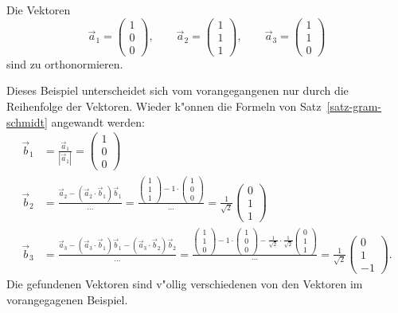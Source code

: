 \begin{beispiel}
Die Vektoren 
\[
\vec a_1=\begin{pmatrix}1\\0\\0\end{pmatrix},\qquad
\vec a_2=\begin{pmatrix}1\\1\\1\end{pmatrix},\qquad
\vec a_3=\begin{pmatrix}1\\1\\0\end{pmatrix} 
\]
sind zu orthonormieren.

Dieses Beispiel unterscheidet sich vom vorangegangenen nur
durch die Reihenfolge der Vektoren. Wieder k"onnen die 
Formeln von Satz~\ref{satz-gram-schmidt} angewandt werden:
\begin{align*}
\vec b_1&=\frac{\vec a_1}{|\vec a_1|}=\begin{pmatrix}1\\0\\0\end{pmatrix}
\\
\vec b_2
&=
\frac{\vec a_2-(\vec a_2\cdot \vec b_1)\vec b_1}{\dots}
=
\frac{\begin{pmatrix}1\\1\\1\end{pmatrix}-1\cdot\begin{pmatrix}1\\0\\0\end{pmatrix}}{\dots}=\frac1{\sqrt{2}}\begin{pmatrix}0\\1\\1\end{pmatrix}
\\
\vec b_3
&=
\frac{\vec a_3-(\vec a_3\cdot\vec b_1)\vec b_1-(\vec a_3\cdot\vec b_2)\vec b_2}{\dots}
=\frac{\begin{pmatrix}1\\1\\0\end{pmatrix}-1\cdot\begin{pmatrix}1\\0\\0\end{pmatrix}-\frac1{\sqrt{2}}\cdot\frac1{\sqrt{2}}\begin{pmatrix}0\\1\\1\end{pmatrix} }{\cdots}
=\frac{1}{\sqrt{2}}\begin{pmatrix}0\\1\\-1\end{pmatrix}.
\end{align*}
Die gefundenen Vektoren sind v"ollig verschiedenen von den Vektoren
im vorangegagenen Beispiel.
\end{beispiel}

